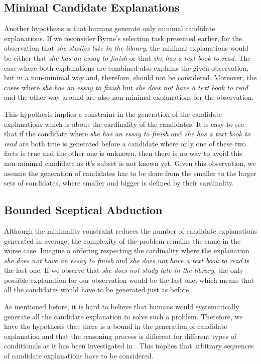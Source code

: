 \subsection{Minimal Candidate Explanations}

Another hypothesis is that humans generate only minimal candidate explanations. If we reconsider Byrne's selection task presented earlier, for the observation that \textit{she studies late in the library}, the minimal explanations would be either that \textit{she has an essay to finish} or that \textit{she has a text book to read}. The case where both explanations are combined also explains the given observation, but in a non-minimal way and, therefore, should not be considered. Moreover, the cases where \textit{she has an essay to finish} but \textit{she does not have a text book to read} and the other way around are also non-minimal explanations for the observation.

This hypothesis implies a constraint in the generation of the candidate explanations which is about the cardinality of the candidates. It is easy to see that if the candidate where \textit{she has an essay to finish} and \textit{she has a text book to read} are both true is generated before a candidate where only one of these two facts is true and the other one is unknown, then there is no way to avoid this non-minimal candidate as it's subset is not known yet. Given this observation, we assume the generation of candidates has to be done from the smaller to the larger sets of candidates, where smaller and bigger is defined by their cardinality. 

\subsection{Bounded Sceptical Abduction}

Although the minimality constraint reduces the number of candidate explanations generated in average, the complexity of the problem remains the same in the worse case. Imagine a ordering respecting the cardinality where the explanation \textit{she does not have an essay to finish} and \textit{she does not have a text book to read} is the last one. If we observe that \textit{she does not study late in the library}, the only possible explanation for our observation would be the last one, which means that all the candidates would have to be generated just as before.

As mentioned before, it is hard to believe that humans would systematically generate all the candidate explanation to solve such a problem. Therefore, we have the hypothesis that there is a bound in the generation of candidate explanation and that the reasoning process is different for different types of conditionals as it has been investigated in \cite{saldanhaobligation}. This implies that arbitrary sequences of candidate explanations have to be considered.

